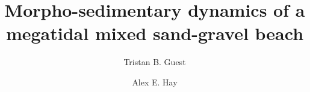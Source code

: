 \documentclass[preprint,12pt,authoryear]{elsarticle}
\begin{document}
\begin{frontmatter}



\title{Morpho-sedimentary dynamics of a megatidal mixed sand-gravel beach}


\author[label1]{Tristan B. Guest}
\author[label1]{Alex E. Hay}
\address[label1]{{Department of Oceanography, Dalhousie University, Halifax, Nova Scotia, B3H 4R2, Canada}}



\begin{abstract}



\end{abstract}
\end{frontmatter}
\end{document}
